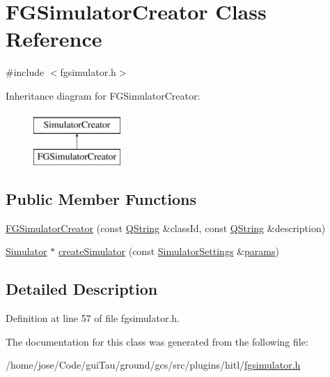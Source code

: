 \hypertarget{class_f_g_simulator_creator}{\section{F\-G\-Simulator\-Creator Class Reference}
\label{class_f_g_simulator_creator}
}


{\ttfamily \#include $<$fgsimulator.\-h$>$}

Inheritance diagram for F\-G\-Simulator\-Creator\-:\begin{figure}[H]
\begin{center}
\leavevmode
\includegraphics[height=2.000000cm]{class_f_g_simulator_creator}
\end{center}
\end{figure}
\subsection*{Public Member Functions}
\begin{DoxyCompactItemize}
\item 
\hyperlink{group___h_i_t_l_plugin_ga5a9c061b4c449fceecb71b3e00412cd3}{F\-G\-Simulator\-Creator} (const \hyperlink{group___u_a_v_objects_plugin_gab9d252f49c333c94a72f97ce3105a32d}{Q\-String} \&class\-Id, const \hyperlink{group___u_a_v_objects_plugin_gab9d252f49c333c94a72f97ce3105a32d}{Q\-String} \&description)
\item 
\hyperlink{class_simulator}{Simulator} $\ast$ \hyperlink{group___h_i_t_l_plugin_gae7287ea22cde35ce9042e313d9d7c14f}{create\-Simulator} (const \hyperlink{group___h_i_t_l_plugin_ga052199f1328d3002bce3e45345aa7f4e}{Simulator\-Settings} \&\hyperlink{glext_8h_afeb6390ab3bc8a0e96a88aff34d52288}{params})
\end{DoxyCompactItemize}


\subsection{Detailed Description}


Definition at line 57 of file fgsimulator.\-h.



The documentation for this class was generated from the following file\-:\begin{DoxyCompactItemize}
\item 
/home/jose/\-Code/gui\-Tau/ground/gcs/src/plugins/hitl/\hyperlink{fgsimulator_8h}{fgsimulator.\-h}\end{DoxyCompactItemize}
